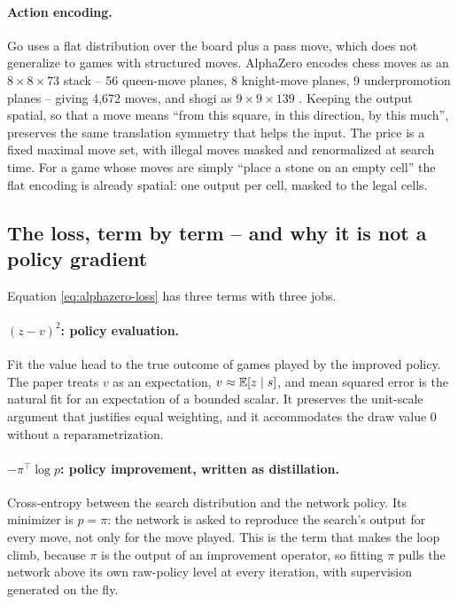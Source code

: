 \paragraph{Action encoding.} Go uses a flat distribution over the board plus a
pass move, which does not generalize to games with structured moves. AlphaZero
encodes chess moves as an $8\times8\times73$ stack -- 56 queen-move planes, 8
knight-move planes, 9 underpromotion planes -- giving 4{,}672 moves, and shogi as
$9\times9\times139$ \citep{silver2018alphazero}. Keeping the output spatial, so
that a move means ``from this square, in this direction, by this much'',
preserves the same translation symmetry that helps the input. The price is a
fixed maximal move set, with illegal moves masked and renormalized at search
time. For a game whose moves are simply ``place a stone on an empty cell'' the
flat encoding is already spatial: one output per cell, masked to the legal cells.

\subsection{The loss, term by term -- and why it is not a policy gradient}
\label{sec:loss}

Equation \eqref{eq:alphazero-loss} has three terms with three jobs.

\paragraph{$(z-v)^2$: policy evaluation.} Fit the value head to the true outcome
of games played by the improved policy. The paper treats $v$ as an expectation,
$v \approx \mathbb{E}[z \mid s]$, and mean squared error is the natural fit for an
expectation of a bounded scalar. It preserves the unit-scale argument that
justifies equal weighting, and it accommodates the draw value $0$ without a
reparametrization.

\paragraph{$-\pi^{\!\top}\log p$: policy improvement, written as distillation.}
Cross-entropy between the search distribution and the network policy. Its
minimizer is $p = \pi$: the network is asked to reproduce the search's output for
every move, not only for the move played. This is the term that makes the loop
climb, because $\pi$ is the output of an improvement operator, so fitting $\pi$
pulls the network above its own raw-policy level at every iteration, with
supervision generated on the fly.

